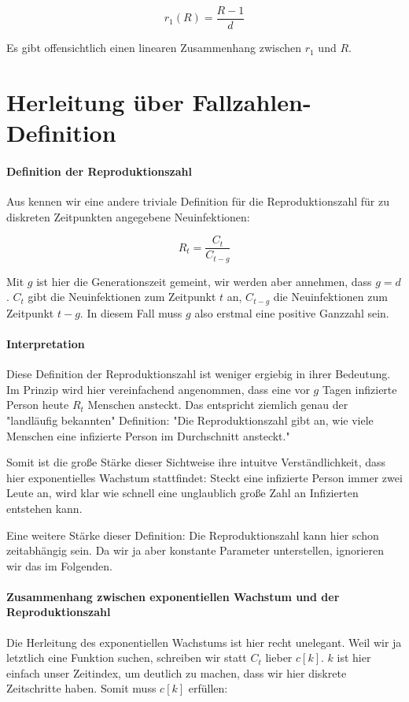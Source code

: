 \documentclass[a4paper]{article}
\begin{document}
    \begin{equation}
        r_{1}(R) = \frac{R-1}{d}
    \end{equation}

    Es gibt offensichtlich einen linearen Zusammenhang zwischen $r_{1}$ und $R$. 

    \section{Herleitung über Fallzahlen-Definition}
    \paragraph{Definition der Reproduktionszahl}Aus \cite{dehning} kennen wir eine andere triviale Definition für die Reproduktionszahl für zu diskreten Zeitpunkten angegebene Neuinfektionen: 

    \begin{equation}
        R_t = \frac{C_t}{C_{t-g}}
    \end{equation}

    Mit $g$ ist hier die Generationszeit gemeint, wir werden aber annehmen, dass $g=d$. $C_t$ gibt die Neuinfektionen zum Zeitpunkt $t$ an, $C_{t-g}$ die Neuinfektionen zum Zeitpunkt $t-g$. In diesem Fall muss $g$ also erstmal eine positive Ganzzahl sein.  

    \paragraph{Interpretation}Diese Definition der Reproduktionszahl ist weniger ergiebig in ihrer Bedeutung. Im Prinzip wird hier vereinfachend angenommen, dass eine vor $g$ Tagen infizierte Person heute $R_t$ Menschen ansteckt. Das entspricht ziemlich genau der "landläufig bekannten" Definition: "Die Reproduktionszahl gibt an, wie viele Menschen eine infizierte Person im Durchschnitt ansteckt." 

    Somit ist die große Stärke dieser Sichtweise ihre intuitve Verständlichkeit, dass hier exponentielles Wachstum stattfindet: Steckt eine infizierte Person immer zwei Leute an, wird klar wie schnell eine unglaublich große Zahl an Infizierten entstehen kann.
    
    Eine weitere Stärke dieser Definition: Die Reproduktionszahl kann hier schon zeitabhängig sein. Da wir ja aber konstante Parameter unterstellen, ignorieren wir das im Folgenden.
    
    \paragraph{Zusammenhang zwischen exponentiellen Wachstum und der Reproduktionszahl}Die Herleitung des exponentiellen Wachstums ist hier recht unelegant. Weil wir ja letztlich eine Funktion suchen, schreiben wir statt $C_t$ lieber $c[k]$. $k$ ist hier einfach unser Zeitindex, um deutlich zu machen, dass wir hier diskrete Zeitschritte haben. Somit muss $c[k]$ erfüllen:
\end{document}
